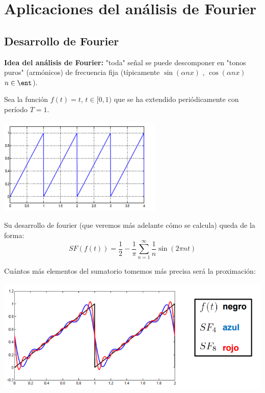 
\chapter{Aplicaciones del análisis de Fourier}
\section{Desarrollo de Fourier}
\textbf{Idea del análisis de Fourier:} "toda" señal se puede descomponer en "tonos puros" (armónicos) de frecuencia fija (típicamente $\sin(\alpha n x)$ , $\cos(\alpha n x)$  $ n \in \ent$).


\begin{example}
Sea la función $f(t)=t$, $t\in[0,1)$ que se ha extendido periódicamente con período $T=1$.

\begin{center}
\includegraphics[width=\linewidth]{img/id_period.png}
\end{center}

Su desarrollo de fourier (que veremos más adelante cómo se calcula) queda de la forma:
\[SF(f(t))=\frac{1}{2}-\frac{1}{π}\sum_{n=1}^{\infty}\frac{1}{n}\sin(2πnt)\]

Cuántos más elementos del sumatorio tomemos más precisa será la proximación:

\begin{center}
\includegraphics[width=\linewidth]{img/id_period_fourier.png}
\end{center}

\end{example}

